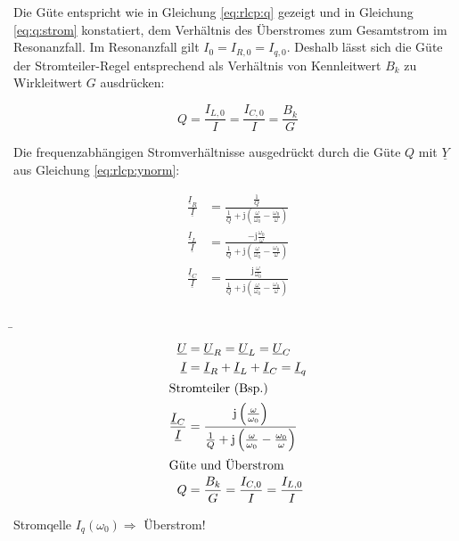 \begin{frame}
{        %
        Die Güte entspricht wie in Gleichung \ref{eq:rlcp:q} gezeigt und in Gleichung \ref{eq:q:strom} konstatiert,
        dem Verhältnis des Überstromes zum Gesamtstrom im Resonanzfall. Im Resonanzfall gilt $I_0 = I_{R,0} = I_{q,0}$.
        Deshalb lässt sich die Güte der Stromteiler-Regel entsprechend als Verhältnis von Kennleitwert $B_k$ zu Wirkleitwert $G$ ausdrücken:

        \begin{equation}
            Q = \frac{I_{L,0}}{I} = \frac{I_{C,0}}{I} = \frac{B_k}{G}
        \end{equation}

        Die frequenzabhängigen Stromverhältnisse ausgedrückt durch die Güte $Q$ mit $\underline{Y}$ aus Gleichung \ref{eq:rlcp:ynorm}:

        \begin{equation}\label{eq:rlcp:ibk:iq:q}
            \begin{aligned}
                \frac{\underline{I}_R}{\underline{I}} &= 
                \frac{\frac{1}{Q}}{\frac{1}{Q}+\mathrm{j}\left(\frac{\omega}{\omega_0}-\frac{\omega_0}{\omega}\right)}\\
            \frac{\underline{I}_L}{\underline{I}} &= 
                \frac{-\mathrm{j}\frac{\omega_0}{\omega}}{\frac{1}{Q}+\mathrm{j}\left(\frac{\omega}{\omega_0}-\frac{\omega_0}{\omega}\right)}\\
            \frac{\underline{I}_C}{\underline{I}} &=
                \frac{\mathrm{j}\frac{\omega}{\omega_0}}{\frac{1}{Q}+\mathrm{j}\left(\frac{\omega}{\omega_0}-\frac{\omega_0}{\omega}\right)}
            \end{aligned}
        \end{equation}
    }%
    \b{%
    \begin{minipage}{0.3\textwidth}%
    \begin{align*}    %
        \underline{U} &= \underline{U}_R = \underline{U}_L = \underline{U}_C \\
        \underline{I} &= \underline{I}_R + \underline{I}_L + \underline{I}_C = \underline{I}_q\\
            \intertext{Stromteiler (Bsp.)}
        \frac{\underline{I}_C}{\underline{I}} &= \frac{\mathrm{j}\left(\frac{\omega}{\omega_0}\right)}{\frac{1}{Q}+\mathrm{j}\left(\frac{\omega}{\omega_0}-\frac{\omega_0}{\omega}\right)}\\
            \intertext{Güte und Überstrom}
        Q &= \frac{B_k}{G} = \frac{I_{C,0}}{I} = \frac{I_{L,0}}{I}
    \end{align*}
    \end{minipage}\hfill%
    \begin{minipage}{0.65\textwidth}\centering
        \par Stromqelle $I_q(\omega_0) \Rightarrow$ Überstrom!
    \end{minipage}
    }
    \end{frame}

